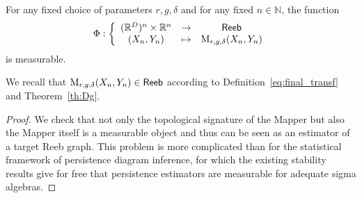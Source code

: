 \begin{prop}\label{prop:Measurability}
For any fixed choice of parameters $r,g,\delta$ and for any fixed $n\in \mathbb{N}$, the function 
$$\Phi:\left\{\begin{array}{ccc}(\mathbb{R}^D)^n\times \mathbb{R}^n & \rightarrow & {\sf Reeb} \\ (X_n,Y_n) & \mapsto & \mathrm{M}_{r,g,\delta}(X_n,Y_n)\end{array}\right.$$ 
is measurable.
\end{prop}

We recall that $\mathrm{M}_{r,g,\delta}(X_n,Y_n)\in{\sf Reeb}$ according to Definition~\ref{eq:final_transf} and Theorem~\ref{th:Dg}.

\begin{proof}
We check that not only the topological signature of the Mapper but
also the Mapper itself is a measurable object and thus can be seen as an
estimator of a target Reeb graph. This problem is
more complicated than for the statistical framework of persistence
diagram inference, for which the existing stability results give for
free that persistence estimators are measurable for adequate sigma
algebras.


\end{proof}
